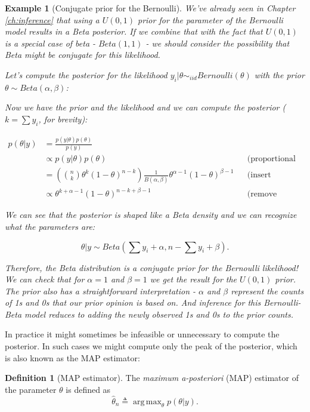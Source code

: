 \documentclass{book}
\theoremstyle{plain}%
\newtheorem{prototheorem}{Example}[section]
\newenvironment{cexample}
   {\colorlet{shadecolor}{gray!10}\begin{shaded}\begin{prototheorem}}
   {\end{prototheorem}\end{shaded}}
\theoremstyle{definition}
\newtheorem{definition}{Definition}[section]
\DeclareMathOperator*{\argmax}{arg\,max}
\begin{document}
\begin{cexample}[Conjugate prior for the Bernoulli] We've already seen in Chapter \ref{ch:inference} that using a $U(0,1)$ prior for the parameter of the Bernoulli model results in a Beta posterior. If we combine that with the fact that $U(0,1)$ is a special case of beta - $Beta(1, 1)$ - we should consider the possibility that Beta might be conjugate for this likelihood.

Let's compute the posterior for the likelihood $y_i | \theta \sim_{iid} Bernoulli(\theta)$ with the prior $\theta \sim Beta(\alpha, \beta)$:


Now we have the prior and the likelihood and we can compute the posterior ($k = \sum y_i$, for brevity):

\begin{align*}
p(\theta|y) &= \frac{p(y|\theta)p(\theta)}{p(y)} \\
&\propto p(y|\theta)p(\theta) && \text{(proportional to)} \\
&=  \left({n \choose k} \theta^{k}(1 -\theta)^{n - k}\right)\frac{1}{B(\alpha, \beta)} \theta^{\alpha - 1}(1-\theta)^{\beta - 1}  && \text{(insert densities)}\\
&\propto \theta^{k + \alpha - 1}(1-\theta)^{n - k + \beta - 1} && \text{(remove constants)}
\end{align*}

We can see that the posterior is shaped like a Beta density and we can recognize what the parameters are:

$$\theta | y \sim Beta(\sum y_i + \alpha, n - \sum y_i + \beta).$$

Therefore, the Beta distribution is a conjugate prior for the Bernoulli likelihood! We can check that for $\alpha = 1$ and $\beta = 1$ we get the result for the $U(0,1)$ prior. The prior also has a straightforward interpretation - $\alpha$ and $\beta$ represent the counts of 1s and 0s that our prior opinion is based on. And inference for this Bernoulli-Beta model reduces to adding the newly observed 1s and 0s to the prior counts.
\end{cexample}

In practice it might sometimes be infeasible or unnecessary to compute the posterior. In such cases we might compute only the peak of the posterior, which is also known as the MAP estimator:

\begin{definition}[MAP estimator]
The \textit{maximum a-posteriori} (MAP) estimator of the parameter $\theta$ is defined as $$\hat{\theta}_n \triangleq \displaystyle\argmax_\theta p(\theta |y).$$
\end{definition}
\end{document}
